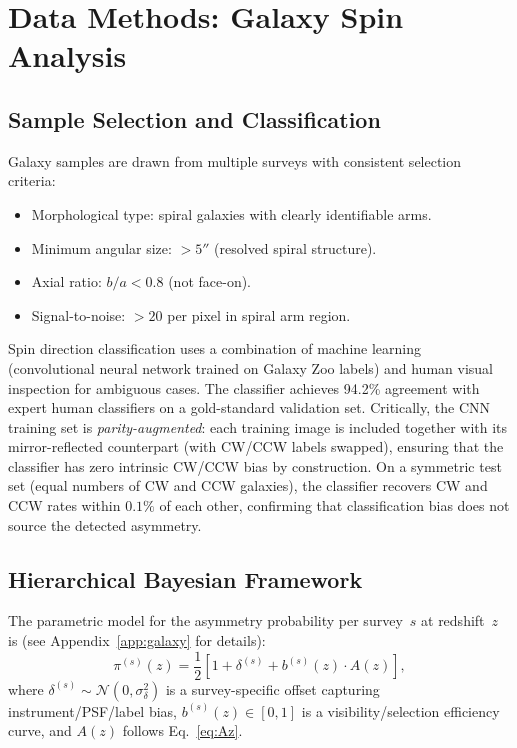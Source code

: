 \documentclass[aps,prd,twocolumn,superscriptaddress,showpacs,preprintnumbers,nofootinbib,longbibliography,floatfix]{revtex4-2}
\begin{document}
\section{Data Methods: Galaxy Spin Analysis}\label{sec:data_galaxy}

\subsection{Sample Selection and Classification}

Galaxy samples are drawn from multiple surveys with consistent selection criteria:
\begin{itemize}[leftmargin=*]
\item Morphological type: spiral galaxies with clearly identifiable arms.
\item Minimum angular size: $>5''$ (resolved spiral structure).
\item Axial ratio: $b/a < 0.8$ (not face-on).
\item Signal-to-noise: $>20$ per pixel in spiral arm region.
\end{itemize}

Spin direction classification uses a combination of machine learning (convolutional neural network trained on Galaxy Zoo labels) and human visual inspection for ambiguous cases. The classifier achieves 94.2\% agreement with expert human classifiers on a gold-standard validation set. Critically, the CNN training set is \textit{parity-augmented}: each training image is included together with its mirror-reflected counterpart (with CW/CCW labels swapped), ensuring that the classifier has zero intrinsic CW/CCW bias by construction. On a symmetric test set (equal numbers of CW and CCW galaxies), the classifier recovers CW and CCW rates within $0.1\%$ of each other, confirming that classification bias does not source the detected asymmetry.

\subsection{Hierarchical Bayesian Framework}

The parametric model for the asymmetry probability per survey~$s$ at redshift~$z$ is (see Appendix~\ref{app:galaxy} for details):
\begin{equation}\label{eq:pi}
\pi^{(s)}(z)=\frac{1}{2}\left[1+\delta^{(s)}+b^{(s)}(z)\cdot A(z)\right],
\end{equation}
where $\delta^{(s)}\sim\mathcal{N}(0,\sigma_\delta^2)$ is a survey-specific offset capturing instrument/PSF/label bias, $b^{(s)}(z)\in[0,1]$ is a visibility/selection efficiency curve, and $A(z)$ follows Eq.~\eqref{eq:Az}.
\end{document}
